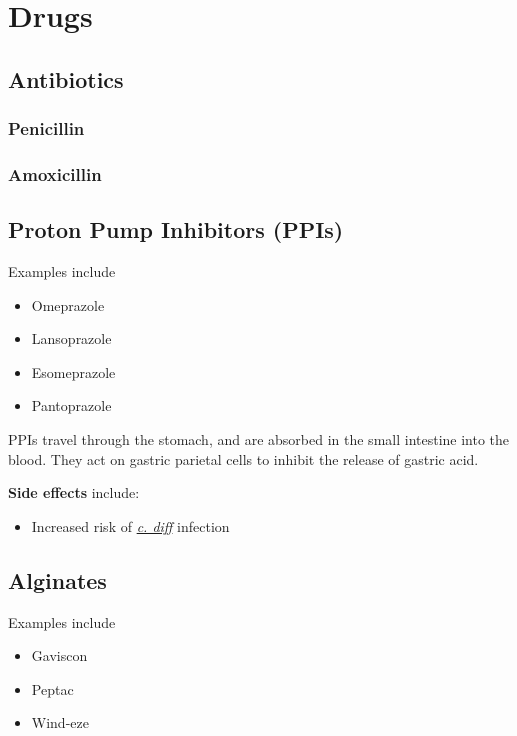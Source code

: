 \chapter{Drugs}

\section{Antibiotics}

\subsection{Penicillin}

\subsection{Amoxicillin}


\section{Proton Pump Inhibitors (PPIs)}

Examples include

\begin{itemize}
    \item Omeprazole
    \item Lansoprazole
    \item Esomeprazole
    \item Pantoprazole
\end{itemize}

PPIs travel through the stomach, and are absorbed in the small intestine into the blood. They act on gastric parietal cells to inhibit the release of gastric acid.

\textbf{Side effects} include:

\begin{itemize}
    \item Increased risk of \hyperref[cond:c-diff]{\textit{c. diff}} infection
\end{itemize}

\section{Alginates}

Examples include

\begin{itemize}
    \item Gaviscon
    \item Peptac
    \item Wind-eze
\end{itemize}

